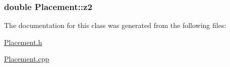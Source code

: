 \subsubsection[{z2}]{\setlength{\rightskip}{0pt plus 5cm}double Placement\+::z2\hspace{0.3cm}{\ttfamily [private]}}\label{classPlacement_aed710205286315a2a14f8cc2ceacd267}


The documentation for this class was generated from the following files\+:\begin{DoxyCompactItemize}
\item 
\hyperlink{Placement_8h}{Placement.\+h}\item 
\hyperlink{Placement_8cpp}{Placement.\+cpp}\end{DoxyCompactItemize}
